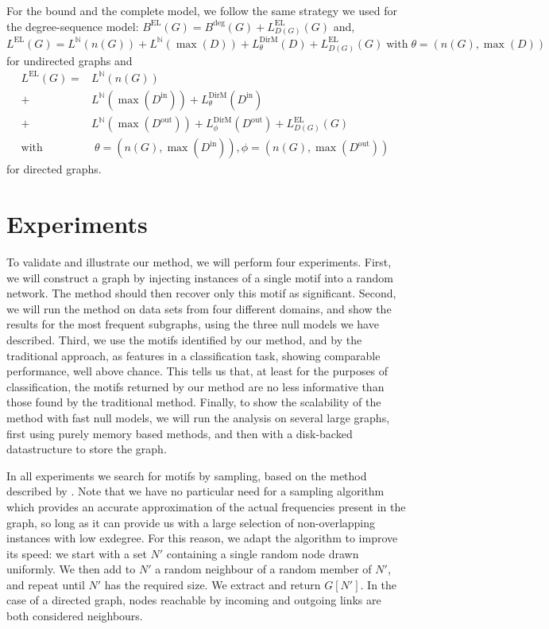 \documentclass[twoside,11pt]{article}
\newcommand{\N}{{\mathbb N}}
\begin{document}
For the bound and the complete model, we follow the same strategy we used for the degree-sequence model: $B^\text{EL}(G) = B^\text{deg}(G) + L^\text{EL}_{D(G)}(G)$ and, 
\[
L^\text{EL}(G) = L^\N(n(G)) + L^\N(\max(D)) + L^\text{DirM}_{\theta}(D) + L^\text{EL}_{D(G)}(G) \;\text{with}\; \theta=(n(G), \max(D))
\] for undirected graphs and 
\begin{align*}
L^\text{EL}(G) = &L^\N(n(G)) \\ 
 + &L^\N(\max(D^\text{in})) + L^\text{DirM}_{\theta}(D^\text{in})\\
 + &L^\N(\max(D^\text{out})) + L^\text{DirM}_{\phi}(D^\text{out}) + L^\text{EL}_{D(G)}(G)\\
 \text{with}&\; \theta=(n(G), \max(D^\text{in})), \phi=(n(G), \max(D^\text{out})) \
\end{align*} for directed graphs.

\section{Experiments}

\label{section:experiments}

To validate and illustrate our method, we will perform four experiments. First, we will construct a graph by injecting instances of a single motif into a random network. The method should then recover only this motif as significant. Second, we will run the method on data sets from four different domains, and show the results for the most frequent subgraphs, using the three null models we have described. Third, we use the motifs identified by our method, and by the traditional approach, as features in a classification task, showing comparable performance, well above chance. This tells us that, at least for the purposes of classification, the motifs returned by our method are no less informative than those found by the traditional method. Finally, to show the scalability of the method with fast null models, we will run the analysis on several large graphs, first using purely memory based methods, and then with a disk-backed datastructure to store the graph.

In all experiments we search for motifs by sampling, based on the method described by \citet{kashtan2004efficient}. Note that we have no particular need for a sampling algorithm which provides an accurate approximation of the actual frequencies present in the graph, so long as it can provide us with a large selection of non-overlapping instances with low exdegree. For this reason, we adapt the algorithm to improve its speed: we start with a set $N'$ containing a single random node drawn uniformly. We then add to $N'$ a random neighbour of a random member of $N'$, and repeat until $N'$ has the required size. We extract and return $G[N']$. In the case of a directed graph, nodes reachable by incoming and outgoing links are both considered neighbours.  
\end{document}
